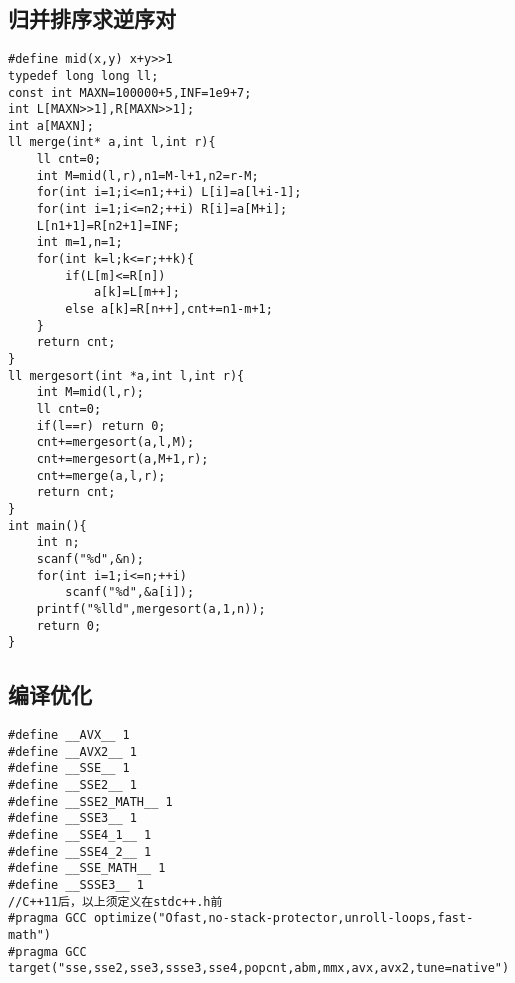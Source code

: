 \documentclass[UTF8]{ctexart}
\begin{document}
\subsection{归并排序求逆序对}
\begin{lstlisting}
#define mid(x,y) x+y>>1
typedef long long ll;
const int MAXN=100000+5,INF=1e9+7;
int L[MAXN>>1],R[MAXN>>1];
int a[MAXN];
ll merge(int* a,int l,int r){
    ll cnt=0;
    int M=mid(l,r),n1=M-l+1,n2=r-M;
    for(int i=1;i<=n1;++i) L[i]=a[l+i-1];
    for(int i=1;i<=n2;++i) R[i]=a[M+i];
    L[n1+1]=R[n2+1]=INF;
    int m=1,n=1;
    for(int k=l;k<=r;++k){
        if(L[m]<=R[n])
            a[k]=L[m++];
        else a[k]=R[n++],cnt+=n1-m+1;
    }
    return cnt;
}
ll mergesort(int *a,int l,int r){
    int M=mid(l,r);
    ll cnt=0;
    if(l==r) return 0;
    cnt+=mergesort(a,l,M);
    cnt+=mergesort(a,M+1,r);
    cnt+=merge(a,l,r);
    return cnt;
}
int main(){
    int n;
    scanf("%d",&n);
    for(int i=1;i<=n;++i)
        scanf("%d",&a[i]);
    printf("%lld",mergesort(a,1,n));
    return 0;
}    
\end{lstlisting}
\subsection{编译优化}
\begin{lstlisting}
#define __AVX__ 1
#define __AVX2__ 1
#define __SSE__ 1
#define __SSE2__ 1
#define __SSE2_MATH__ 1
#define __SSE3__ 1
#define __SSE4_1__ 1
#define __SSE4_2__ 1
#define __SSE_MATH__ 1
#define __SSSE3__ 1
//C++11后，以上须定义在stdc++.h前
#pragma GCC optimize("Ofast,no-stack-protector,unroll-loops,fast-math")
#pragma GCC target("sse,sse2,sse3,ssse3,sse4,popcnt,abm,mmx,avx,avx2,tune=native")
\end{lstlisting}
\end{document}
